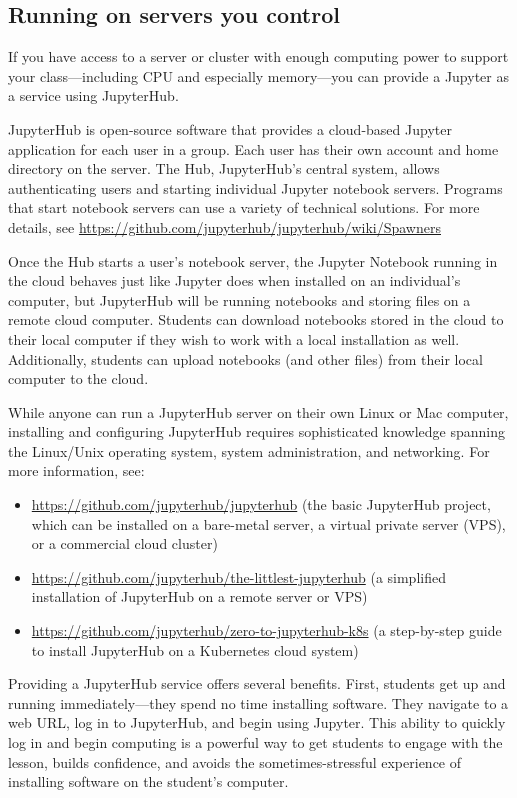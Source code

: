 \documentclass[]{book}
\begin{document}
\subsection{Running on servers you
control}\label{running-on-servers-you-control}

If you have access to a server or cluster with enough computing power to
support your class---including CPU and especially memory---you can
provide a Jupyter as a service using JupyterHub.

JupyterHub is open-source software that provides a cloud-based Jupyter
application for each user in a group. Each user has their own account
and home directory on the server. The Hub, JupyterHub's central system,
allows authenticating users and starting individual Jupyter notebook
servers. Programs that start notebook servers can use a variety of
technical solutions. For more details, see
\url{https://github.com/jupyterhub/jupyterhub/wiki/Spawners}

Once the Hub starts a user's notebook server, the Jupyter Notebook
running in the cloud behaves just like Jupyter does when installed on an
individual's computer, but JupyterHub will be running notebooks and
storing files on a remote cloud computer. Students can download
notebooks stored in the cloud to their local computer if they wish to
work with a local installation as well. Additionally, students can
upload notebooks (and other files) from their local computer to the
cloud.

While anyone can run a JupyterHub server on their own Linux or Mac
computer, installing and configuring JupyterHub requires sophisticated
knowledge spanning the Linux/Unix operating system, system
administration, and networking. For more information, see:

\begin{itemize}
\item
  \url{https://github.com/jupyterhub/jupyterhub} (the basic JupyterHub
  project, which can be installed on a bare-metal server, a virtual
  private server (VPS), or a commercial cloud cluster)
\item
  \url{https://github.com/jupyterhub/the-littlest-jupyterhub} (a
  simplified installation of JupyterHub on a remote server or VPS)
\item
  \url{https://github.com/jupyterhub/zero-to-jupyterhub-k8s} (a
  step-by-step guide to install JupyterHub on a Kubernetes cloud system)
\end{itemize}

Providing a JupyterHub service offers several benefits. First, students
get up and running immediately---they spend no time installing software.
They navigate to a web URL, log in to JupyterHub, and begin using
Jupyter. This ability to quickly log in and begin computing is a
powerful way to get students to engage with the lesson, builds
confidence, and avoids the sometimes-stressful experience of installing
software on the student's computer.
\end{document}
